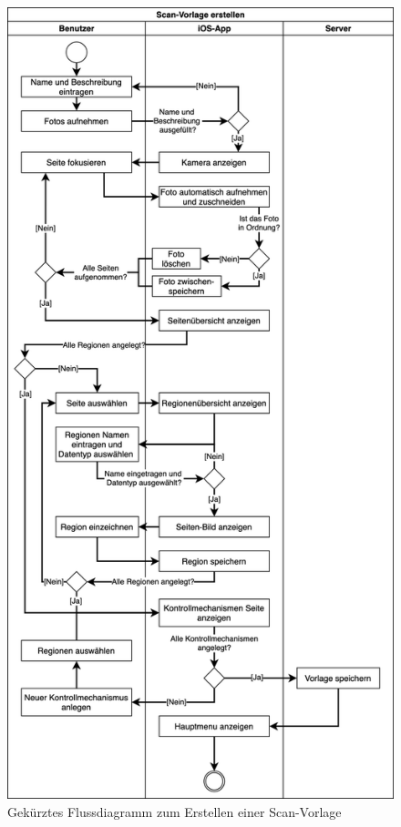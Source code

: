 \documentclass[notables, nomenclature, oneside, 150]{HSMW-Thesis}
\begin{document}
	\begin{figure}[th]
   		\centering
   		\includegraphics[width=\textwidth,height=\textheight,keepaspectratio]{img/erstellen_flow}
   		\caption{Gekürztes Flussdiagramm zum Erstellen einer Scan-Vorlage}
   		\label{fig:erstellen_flow}
   	\end{figure}
   	
\end{document}
